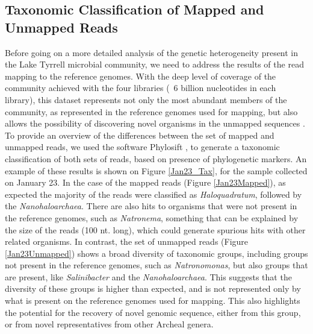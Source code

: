 \clearpage
\subsection{Taxonomic Classification of Mapped and Unmapped Reads}

Before going on a more detailed analysis of the genetic heterogeneity present in the Lake Tyrrell microbial community, we need to address the results of the read mapping to the reference genomes. With the deep level of coverage of the community achieved with the four libraries (~6 billion nucleotides in each library), this dataset represents not only the most abundant members of the community, as represented in the reference genomes used for mapping, but also allows the possibility of discovering novel organisms in the unmapped sequences \cite{Narasingarao:2012kp,Albertsen:2013gpa}. To provide an overview of the differences between the set of mapped and unmapped reads, we used the software Phylosift \cite{Darling:2014ej}, to generate a taxonomic classification of both sets of reads, based on presence of phylogenetic markers. An example of these results is shown on Figure \ref{Jan23_Tax}, for the sample collected on January 23. In the case of the mapped reads (Figure \ref{Jan23Mapped}), as expected the majority of the reads were classified as \textit{Haloquadratum}, followed by the \textit{Nanohaloarchaea}. There are also hits to organisms that were not present in the reference genomes, such as \textit{Natronema}, something that can be explained by the size of the reads (100 nt. long), which could generate spurious hits with other related organisms. In contrast, the set of unmapped reads (Figure \ref{Jan23Unmapped}) shows a broad diversity of taxonomic groups, including groups not present in the reference genomes, such as \textit{Natronomonas}, but also groups that are present, like \textit{Salinibacter} and the \textit{Nanohaloarchaea}. This suggests that the diversity of these groups is higher than expected, and is not represented only by what is present on the reference genomes used for mapping. This also highlights the potential for the recovery of novel genomic sequence, either from this group, or from novel representatives from other Archeal genera.


